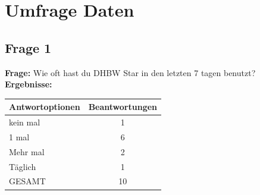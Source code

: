 \chapter{Umfrage Daten}
\section{Frage 1}
\begin{figure}
	\centering
\end{figure}
\textbf{Frage:} Wie oft hast du DHBW Star in den letzten 7 tagen benutzt?\\
\textbf{Ergebnisse:}\\
\begin{tabular}{|l|c|}\hline
	\textbf{Antwortoptionen} & \textbf{Beantwortungen} \\\hline
	kein mal & 1 \\\hline
	1 mal	 & 6 \\\hline
	Mehr mal & 2 \\\hline
	Täglich  & 1 \\\hline
	GESAMT	 & 10 \\\hline			
\end{tabular}



